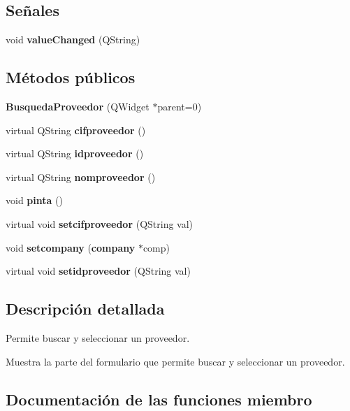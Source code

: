 \subsection*{Se\~{n}ales}
\begin{CompactItemize}
\item 
void {\bf value\-Changed} (QString)\label{classBusquedaProveedor_l0}

\end{CompactItemize}
\subsection*{M\'{e}todos p\'{u}blicos}
\begin{CompactItemize}
\item 
{\bf Busqueda\-Proveedor} (QWidget $\ast$parent=0)\label{classBusquedaProveedor_a0}

\item 
virtual QString {\bf cifproveedor} ()\label{classBusquedaProveedor_a1}

\item 
virtual QString {\bf idproveedor} ()\label{classBusquedaProveedor_a2}

\item 
virtual QString {\bf nomproveedor} ()\label{classBusquedaProveedor_a3}

\item 
void {\bf pinta} ()\label{classBusquedaProveedor_a4}

\item 
virtual void {\bf setcifproveedor} (QString val)\label{classBusquedaProveedor_a5}

\item 
void {\bf setcompany} ({\bf company} $\ast$comp)\label{classBusquedaProveedor_a6}

\item 
virtual void {\bf setidproveedor} (QString val)\label{classBusquedaProveedor_a7}

\end{CompactItemize}


\subsection{Descripci\'{o}n detallada}
Permite buscar y seleccionar un proveedor. 

Muestra la parte del formulario que permite buscar y seleccionar un proveedor. 



\subsection{Documentaci\'{o}n de las funciones miembro}

